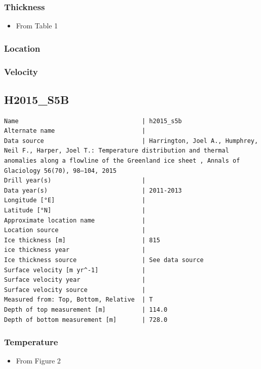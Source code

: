 \documentclass[article,a4paper,times,11pt,twoside]{article}
\begin{document}
\subsubsection{Thickness}
\label{sec:org6f4022c}

\begin{itemize}
\item From \textcite{harrington_2015} Table 1
\end{itemize}

\subsubsection{Location}
\label{sec:orgddb4be4}

\subsubsection{Velocity}
\label{sec:org0c3881c}
\clearpage
\subsection{H2015\_S5B}
\label{sec:org9930ea2}
\begin{verbatim}
Name                                  | h2015_s5b
Alternate name                        | 
Data source                           | Harrington, Joel A., Humphrey, Neil F., Harper, Joel T.: Temperature distribution and thermal anomalies along a flowline of the Greenland ice sheet , Annals of Glaciology 56(70), 98–104, 2015 
Drill year(s)                         | 
Data year(s)                          | 2011-2013
Longitude [°E]                        | 
Latitude [°N]                         | 
Approximate location name             | 
Location source                       | 
Ice thickness [m]                     | 815
ice thickness year                    | 
Ice thickness source                  | See data source
Surface velocity [m yr^-1]            | 
Surface velocity year                 | 
Surface velocity source               | 
Measured from: Top, Bottom, Relative  | T
Depth of top measurement [m]          | 114.0
Depth of bottom measurement [m]       | 728.0
\end{verbatim}

\subsubsection{Temperature}
\label{sec:org8ed737e}

\begin{itemize}
\item From \textcite{harrington_2015} Figure 2
\end{itemize}
\end{document}
